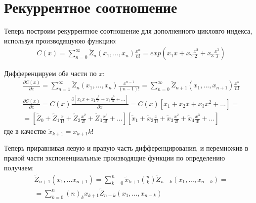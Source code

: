 \section{Рекуррентное соотношение}

Теперь построим рекуррентное соотношение для дополненного цикловго индекса, используя производящуюю функцию:
\[
	\begin{split}
		& C\left(x\right) = \sum_{n=0}^{\infty} \tilde Z_n\left(x_1, ..., x_n\right) \frac{x^n}{n!} = exp\left(x_1x + x_2 \frac{x^2}{2} + x_3 \frac{x^3}{3}\right)
	\end{split}
\]

Дифференцируем обе части по $x$:
\[
	\begin{split}
		&\frac{\partial C\left(x\right)}{\partial x} = \sum_{n=1}^{\infty} \tilde Z_n \left(x_1, ..., x_n\right) \frac{x^{n-1}}{\left(n-1\right)!} = \sum_{n=0}^{\infty} \tilde Z_{n+1} \left(x_1, ..., x_{n+1}\right) \frac{x^n}{n!}\\
		&\frac{\partial C\left(x\right)}{\partial x} = C\left(x\right)\frac{\partial \left[x_1x + x_2\frac{x^2}{2} + x_3 \frac{x^3}{3} + ...\right]}{\partial x} = C\left(x\right) \left[x_1 + x_2 x + x_3 x^2 + ...\right] = \\
		& = \left[\tilde Z_0 + \tilde Z_1 \frac{x}{1!} + \tilde Z_2 \frac{x^2}{2!} + \tilde Z_3 \frac{x^3}{3!} + ...\right]\left[\tilde x_1 + \tilde x_2 \frac{x}{1!} + \tilde x_3 \frac{x^2}{2!} + \tilde x_4 \frac{x^3}{3!} + ...\right]
	\end{split}
\]
где в качестве $\tilde x_{k+1} = x_{k+1} k!$

Теперь приравнивая левую и правую часть дифференцирования, и перемножив в правой части экспоненциальные производящие функции по определению получаем:
\[
	\begin{split}
		&\tilde Z_{n+1} \left(x_1, ... x_{n+1}\right) = \sum_{k=0}^n \tilde x_{k+1} \binom{n}{k} \tilde Z_{n-k}\left(x_1, ..., x_{n-k}\right) =\\
		&= \sum_{k=0}^n \left(n\right)_k x_{k+1} \tilde Z_{n-k} \left(x_1, ..., x_{n-k}\right)
	\end{split}
\]